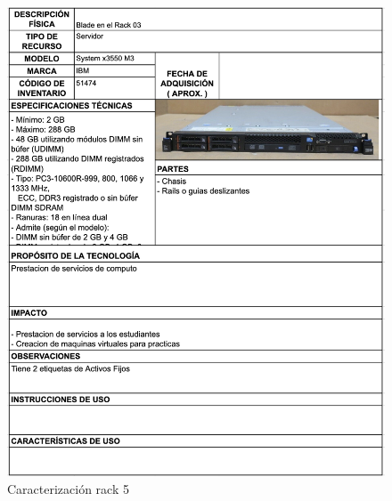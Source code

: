 \begin{figure}[H]
    \centering
    \includegraphics[width=\textwidth] {tablas-images/cp1/racks/rack-5.png}
    \caption{Caracterización rack 5}\label{fig:rack-5}
\end{figure}

